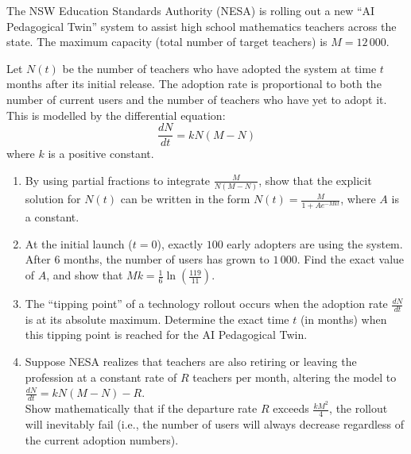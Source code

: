 \begin{problem}
The NSW Education Standards Authority (NESA) is rolling out a new ``AI Pedagogical Twin'' system to assist high school mathematics teachers across the state. The maximum capacity (total number of target teachers) is $M = 12\,000$.

Let $N(t)$ be the number of teachers who have adopted the system at time $t$ months after its initial release. The adoption rate is proportional to both the number of current users and the number of teachers who have yet to adopt it. This is modelled by the differential equation:
\[ \frac{dN}{dt} = k N (M - N) \]
where $k$ is a positive constant.

\begin{enumerate}
    \item[\textbf{i}] By using partial fractions to integrate $\frac{M}{N(M-N)}$, show that the explicit solution for $N(t)$ can be written in the form $N(t) = \frac{M}{1 + A e^{-Mkt}}$, where $A$ is a constant.
    \item[\textbf{ii}] At the initial launch ($t=0$), exactly $100$ early adopters are using the system. After $6$ months, the number of users has grown to $1\,000$. Find the exact value of $A$, and show that $Mk = \frac{1}{6} \ln\left(\frac{119}{11}\right)$.
    \item[\textbf{iii}] The ``tipping point'' of a technology rollout occurs when the adoption rate $\frac{dN}{dt}$ is at its absolute maximum. Determine the exact time $t$ (in months) when this tipping point is reached for the AI Pedagogical Twin.
    \item[\textbf{iv}] Suppose NESA realizes that teachers are also retiring or leaving the profession at a constant rate of $R$ teachers per month, altering the model to $\frac{dN}{dt} = kN(M-N) - R$. \\
    Show mathematically that if the departure rate $R$ exceeds $\frac{kM^2}{4}$, the rollout will inevitably fail (i.e., the number of users will always decrease regardless of the current adoption numbers).
\end{enumerate}
\end{problem}

